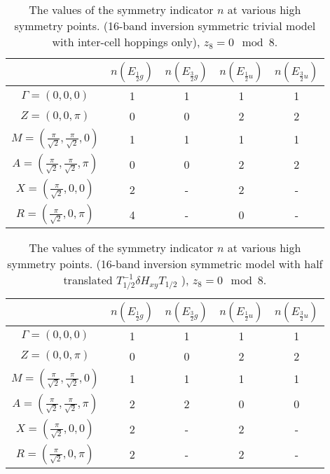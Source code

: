 \begin{table}[h]
 \begin{tabular}{c|cccc}
   & $n(E_{\frac{1}{2}g})$ & $n(E_{\frac{3}{2}g})$ & $n(E_{\frac{1}{2}u})$ & $n(E_{\frac{3}{2}u})$  \\
 \hline 
 $\Gamma = (0,0,0)$ & 1 & 1 & 1 & 1 \\
 $Z = (0,0,\pi)$ & 0 & 0 & 2 & 2 \\
 $M = (\frac{\pi}{\sqrt{2}},\frac{\pi}{\sqrt{2}},0)$ & 1 & 1 & 1 & 1 \\
 $A = (\frac{\pi}{\sqrt{2}},\frac{\pi}{\sqrt{2}},\pi)$ & 0 & 0 & 2 & 2 \\ 
 $X = (\frac{\pi}{\sqrt{2}},0,0)$ & 2 & - & 2 & - \\
 $R = (\frac{\pi}{\sqrt{2}},0,\pi)$ & 4 & - & 0 & -
 \end{tabular}
 \caption{The values of the symmetry indicator $n$ at various high symmetry points. (16-band inversion symmetric trivial model with inter-cell hoppings only), $z_8 = 0 \mod 8$.} \label{SymmetryIndicatortriv2}
 \end{table}
 
  \begin{table}[h]
 \begin{tabular}{c|cccc}
   & $n(E_{\frac{1}{2}g})$ & $n(E_{\frac{3}{2}g})$ & $n(E_{\frac{1}{2}u})$ & $n(E_{\frac{3}{2}u})$  \\
 \hline 
 $\Gamma = (0,0,0)$ & 1 & 1 & 1 & 1 \\
 $Z = (0,0,\pi)$ & 0 & 0 & 2 & 2 \\
 $M = (\frac{\pi}{\sqrt{2}},\frac{\pi}{\sqrt{2}},0)$ & 1 & 1 & 1 & 1 \\
 $A = (\frac{\pi}{\sqrt{2}},\frac{\pi}{\sqrt{2}},\pi)$ & 2 & 2 & 0 & 0 \\ 
 $X = (\frac{\pi}{\sqrt{2}},0,0)$ & 2 & - & 2 & - \\
 $R = (\frac{\pi}{\sqrt{2}},0,\pi)$ & 2 & - & 2 & -
 \end{tabular}
 \caption{The values of the symmetry indicator $n$ at various high symmetry points. (16-band inversion symmetric model with half translated $T_{1/2}^{-1} \delta H_{xy} T_{1/2}$ ), $z_8 = 0 \mod 8$.} \label{SymmetryIndicatorTranslated}
 \end{table}
 
 
